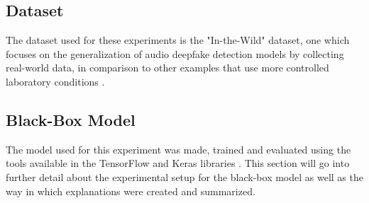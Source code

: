 \documentclass{article}
\begin{document}
		\subsection{Dataset}
		The dataset used for these experiments is the "In-the-Wild" dataset, one which focuses on
		the generalization of audio deepfake detection models by collecting real-world data, in
		comparison to other examples that use more controlled laboratory conditions
		\cite{muller_does_2022}.
		\subsection{Black-Box Model}
		The model used for this experiment was made, trained and evaluated using the tools
		available in the TensorFlow and Keras libraries \cite{tensorflow2015-whitepaper}. This
		section will go into further detail about the experimental setup for the black-box model
		as well as the way in which explanations were created and summarized.
\end{document}
